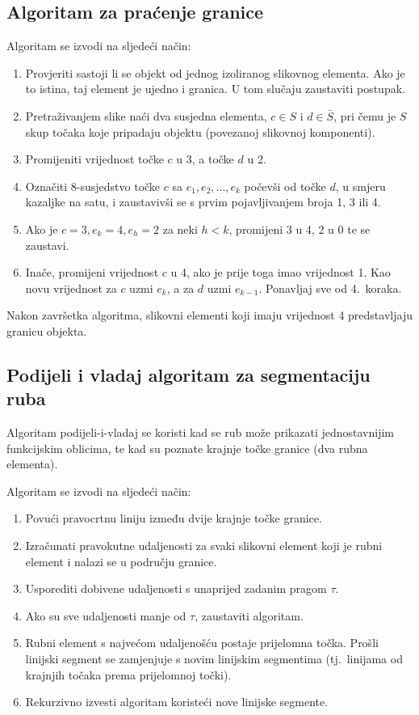\documentclass[lmodern, utf8, seminar, numeric]{fer}
\begin{document}
\subsection{Algoritam za praćenje granice}
Algoritam se izvodi na sljedeći način:
\begin{enumerate}
  \item Provjeriti sastoji li se objekt od jednog izoliranog slikovnog elementa. Ako je to istina, taj element je ujedno i granica. U tom slučaju zaustaviti postupak.
  \item Pretraživanjem slike naći dva susjedna elementa, $c \in S$ i $d \in \bar S$, pri čemu je $S$ skup točaka koje pripadaju objektu (povezanoj slikovnoj komponenti).
  \item Promijeniti vrijednost točke $c$ u 3, a točke $d$ u 2.
  \item Označiti 8-susjedstvo točke $c$ sa $e_1, e_2, \ldots ,e_k$ počevši od točke $d$, u smjeru kazaljke na satu, i zaustavivši se s prvim pojavljivanjem broja 1, 3 ili 4.
  \item Ako je $c=3, e_k=4, e_h=2$ za neki $h<k$, promijeni 3 u 4, 2 u 0 te se zaustavi.
  \item Inače, promijeni vrijednost $c$ u 4, ako je prije toga imao vrijednost 1. Kao novu vrijednost za $c$ uzmi $e_k$, a za $d$ uzmi $e_{k-1}$. Ponavljaj sve od 4.\ koraka.
\end{enumerate}
Nakon završetka algoritma, slikovni elementi koji imaju vrijednost 4 predstavljaju granicu objekta.

\subsection{Podijeli i vladaj algoritam za segmentaciju ruba}
Algoritam podijeli-i-vladaj se koristi kad se rub može prikazati jednostavnijim funkcijskim oblicima, te kad su poznate krajnje točke granice (dva rubna elementa).

Algoritam se izvodi na sljedeći način:
\begin{enumerate}
  \item
Povući pravocrtnu liniju između dvije krajnje točke granice.
   \item Izračunati pravokutne udaljenosti za svaki slikovni element koji je rubni element i nalazi se u području granice.
   \item Usporediti dobivene udaljenosti s unaprijed zadanim pragom $\tau$.
   \item Ako su sve udaljenosti manje od $\tau$, zaustaviti algoritam.
   \item Rubni element s najvećom udaljenošću postaje prijelomna točka. Prošli linijski segment se zamjenjuje s novim linijskim segmentima (tj.\ linijama od krajnjih točaka prema prijelomnoj točki).
   \item Rekurzivno izvesti algoritam koristeći nove linijske segmente.
\end{enumerate}
\end{document}
